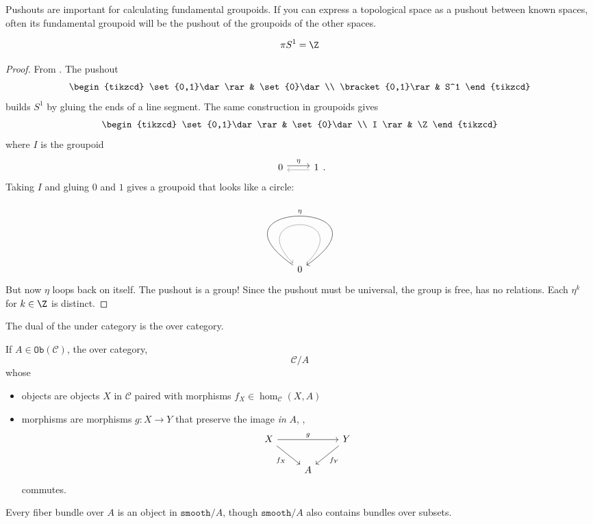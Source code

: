 \documentclass[a5paper]{scrartcl}
\def\cat{\mathcal{C}}
\def\smooth{\texttt{smooth}}
\newcommand{\obj}{\texttt{Ob}}
\DeclareMathOperator*{\Hom}{hom}
\def\hom{\Hom}
\begin{document}
Pushouts are important for calculating fundamental groupoids. If you can express a topological space as a pushout between known spaces, often its fundamental groupoid will be the pushout of the groupoids of the other spaces\cite[xxi]{groupoid}.
\begin{theorem}
  \[
    \pi S^1 = \Z
  \]
\end{theorem}
\begin{proof} From \cite[xxi]{groupoid}.
  The pushout
  \[
    \begin{tikzcd}
      \set{0,1}\dar\rar& \set{0}\dar \\
      \bracket{0,1}\rar& S^1
    \end{tikzcd}
  \]
  builds \(S^1\) by gluing the ends of a line segment. The same construction in groupoids gives
  \[
    \begin{tikzcd}
      \set{0,1}\dar\rar& \set{0}\dar \\
      I \rar& \Z
    \end{tikzcd}
  \]
  where \(I\) is the groupoid
  \[
    \begin{tikzcd}
      0\rar[shift left = .5ex]{\eta}& 1 \lar[shift left = .5ex,gray]{}
    \end{tikzcd}.
  \]
  Taking \(I\) and gluing \(0\) and \(1\) gives a groupoid that looks like a circle:
  \[
    \begin{tikzcd}
      0  \ar[<-,swap,loop,"\eta", in=145,out=35, looseness=22]{}
       \ar[gray,swap,loop,looseness=14]{}
    \end{tikzcd}
  \]
  But now \(\eta\) loops back on itself. The pushout is a group! Since the pushout must be universal, the group is free, has no relations. Each \(\eta^k\) for \(k\in\Z\) is distinct.
\end{proof}

The dual of the under category is the over category.
\begin{defn}
  If \(A\in\obj(\cat)\), the over category,
  \[
     \cat/ A
  \]
  whose
  \begin{itemize}
    \item objects are objects \(X\) in \(\cat\) paired with morphisms \(f_X\in\hom_\cat(X , A)\)
    \item morphisms are morphisms \(g: X \to Y\) that preserve the image \emph{in} \(A\), \ie,
          \[
          \begin{tikzcd}
            X\ar[swap,"f_X"]{dr} \ar["g"]{rr} && Y\ar["f_Y"]{dl} \\
            &A
          \end{tikzcd}
          \]
          commutes.
  \end{itemize}
\end{defn}
Every fiber bundle over \(A\) is an object in \(\smooth/A\), though \(\smooth/A\) also contains bundles over subsets.
\end{document}
